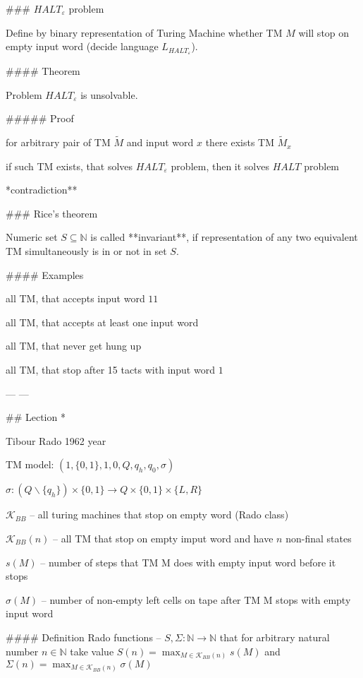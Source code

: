 \documentclass[12pt,letterpaper]{report}
\begin{document}
### $HALT_\varepsilon$ problem

Define by binary representation of Turing Machine whether TM $M$ will stop on empty input word (decide language $L_{HALT_\varepsilon}$).

#### Theorem

Problem $HALT_\varepsilon$ is unsolvable.

##### Proof
\item for arbitrary pair of TM $\widetilde{M}$ and input word $x$ there exists TM $\widetilde{M}_x$
\item if such TM exists, that solves $HALT_\varepsilon$ problem, then it solves $HALT$ problem
\item **contradiction**

### Rice's theorem

Numeric set $S \subseteq \mathbb{N}$ is called **invariant**, if representation of any two equivalent TM simultaneously is in or not in set $S$.

#### Examples
\item all TM, that accepts input word $11$
\item all TM, that accepts at least one input word
\item all TM, that never get hung up
\item all TM, that stop after 15 tacts with input word $1$

---
---

## Lection *

\item Tibour Rado 1962 year
\item TM model: $(1, \{0, 1\}, {1}, 0, Q, q_h, q_0, \sigma)$
\item $\sigma : (Q \backslash \{q_h\}) \times \{0,1\} \rightarrow Q \times \{0,1\} \times \{L, R\}$
\item $\mathcal{K}_{BB}$ -- all turing machines that stop on empty word (Rado class)
\item $\mathcal{K}_{BB}(n)$ -- all TM that stop on empty imput word and have $n$ non-final states
\item $s(M)$ -- number of steps that TM M does with empty input word before it stops
\item $\sigma(M)$ -- number of non-empty left cells on tape after TM M stops with empty input word

#### Definition 
Rado functions -- $S, \Sigma : \mathbb{N} \rightarrow \mathbb{N}$ that for arbitrary natural number $n \in \mathbb{N}$ take value $S(n) = \max_{M \in \mathcal{K}_{BB}(n)} s(M)$ and $\Sigma(n) = \max_{M \in \mathcal{K}_{BB}(n)} \sigma(M)$
\end{document}
